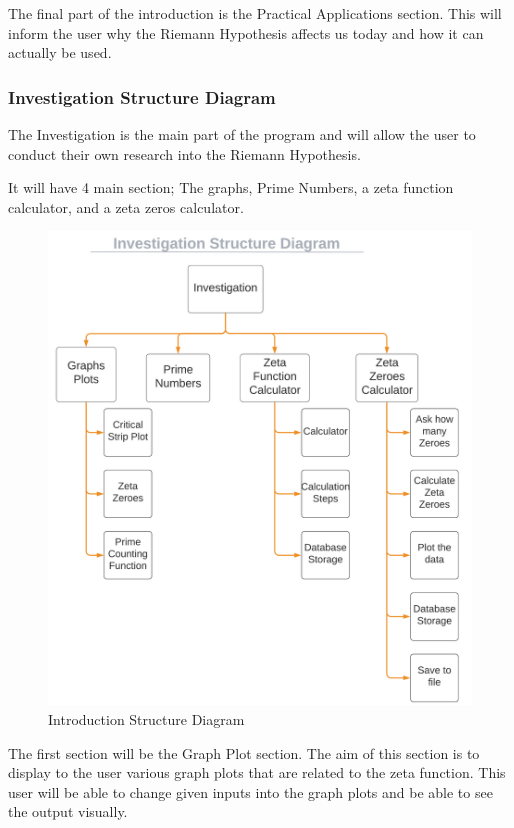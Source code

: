 \documentclass{article}
\begin{document}
The final part of the introduction is the Practical Applications section. This will inform the user why the Riemann Hypothesis affects us today and how it can actually be used.

\clearpage
\subsubsection{Investigation Structure Diagram}
The Investigation is the main part of the program and will allow the user to conduct their own research into the Riemann Hypothesis.

It will have 4 main section; The graphs, Prime Numbers, a zeta function calculator, and a zeta zeros calculator.

\begin{figure}[h]
    \centering
    \captionsetup{justification=centering}
    \includegraphics[scale=0.5]{investigation-structure-diagram}
    \caption{Introduction Structure Diagram}
\end{figure}

The first section will be the Graph Plot section. The aim of this section is to display to the user various graph plots that are related to the zeta function. This user will be able to change given inputs into the graph plots and be able to see the output visually.
\end{document}

